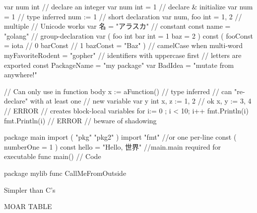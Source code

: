 \documentclass[10pt]{article}
\begin{document}
\begin{minipage}[t]{.25\textwidth}
    \begin{codebox}[Declaration]
        \begin{gocode}
            var num int     // declare an integer
            var num int = 1 // declare & initialize
            var num = 1     // type inferred
            num := 1        // short declaration
            var num, foo int = 1, 2 // multiple
            // Unicode works
            var 名 = "アラスカ"
            // constant
            const name = "golang"
            // group-declaration
            var (
                foo int
                bar int = 1
                baz = 2
            )
            const (
                fooConst = iota // 0
                barConst        // 1
                bazConst = "Baz"
            )
            // camelCase when multi-word
            myFavoriteRodent = "gopher"
            // identifiers with uppercase first
            // letters are exported
            const PackageName = "my package"
            var BadIdea = "mutate from anywhere!"
        \end{gocode}
        \begin{gocode}
            // Can only use in function body
            x := aFunction() // type inferred
            // can "re-declare" with at least one
            // new variable
            var y int
            x, z := 1, 2 // ok
            x, y := 3, 4 // ERROR
            // creates block-local variables
            for i:= 0 ; i < 10; i++ {
                fmt.Println(i)
            }
            fmt.Println(i) // ERROR
            // beware of shadowing
        \end{gocode}
        \begin{gocode}
        \end{gocode}
    \end{codebox}
\end{minipage}%
\begin{minipage}[t]{.25\textwidth}
	\begin{codebox}
        \begin{gocode}
            package main
            import (
                "pkg"
                "pkg2"
            )
            import "fmt" //or one per-line
            const (
                numberOne = 1
            )
            const hello = "Hello, 世界"
            //main.main required for executable
            func main() {
                // Code
            }
		\end{gocode}
        \begin{gocode}
            package mylib
            func CallMeFromOutside
        \end{gocode}
	\end{codebox}
    \begin{codebox}
        Simpler than C's

        MOAR TABLE
    \end{codebox}
\end{minipage}%
\end{document}
